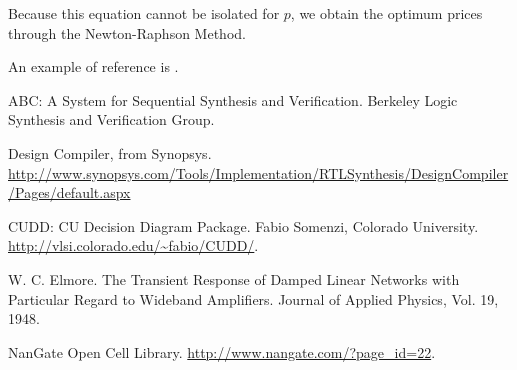 \documentclass[12pt]{article}
\begin{document}
Because this equation cannot be isolated for $p$, we obtain the optimum prices through the Newton-Raphson Method.

An example of reference is \cite{abc}.

\newpage
\begin{thebibliography}{9}

ABC: A System for Sequential Synthesis and Verification. Berkeley Logic Synthesis and Verification Group.
 
Design Compiler, from Synopsys. \url{http://www.synopsys.com/Tools/Implementation/RTLSynthesis/DesignCompiler/Pages/default.aspx}

CUDD: CU Decision Diagram Package. Fabio Somenzi, Colorado University. \url{http://vlsi.colorado.edu/~fabio/CUDD/}.

W. C. Elmore. The Transient Response of Damped Linear Networks with Particular Regard to Wideband Amplifiers. Journal of Applied Physics, Vol. 19, 1948.

NanGate Open Cell Library. \url{http://www.nangate.com/?page_id=22}.
\end{thebibliography}

\newpage
\listoffigures

\newpage
\listoftables

%
\end{document}
